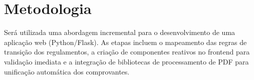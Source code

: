 \chapter{Metodologia}

Será utilizada uma abordagem incremental para o desenvolvimento de uma aplicação web (Python/Flask). As etapas incluem o mapeamento das regras de transição dos regulamentos, a criação de componentes reativos no frontend para validação imediata e a integração de bibliotecas de processamento de PDF para unificação automática dos comprovantes.